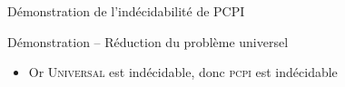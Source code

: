 \begin{frame}{Démonstration de l'indécidabilité de PCPI}
\begin{block}{Démonstration -- Réduction du problème universel}
    \vspace{-2mm}
    \begin{itemize}
    \item Or \textsc{Universal} est indécidable, donc \textsc{pcpi} est indécidable
    \end{itemize}
  \end{block}
  
\end{frame}

\endgroup
\endinput
